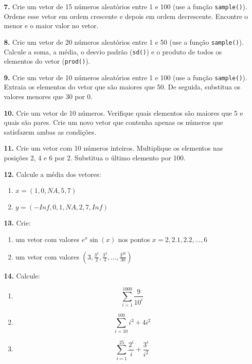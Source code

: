 \documentclass[
]{book}
\providecommand{\tightlist}{%
  \setlength{\itemsep}{0pt}\setlength{\parskip}{0pt}}
\begin{document}
\textbf{7.} Crie um vetor de 15 números aleatórios entre 1 e 100 (use a
função \texttt{sample()}). Ordene esse vetor em ordem crescente e depois em
ordem decrescente. Encontre o menor e o maior valor no vetor.

\textbf{8.} Crie um vetor de 20 números aleatórios entre 1 e 50 (use a função
\texttt{sample()}). Calcule a soma, a média, o desvio padrão (\texttt{sd()}) e o produto de
todos os elementos do vetor (\texttt{prod()}).

\textbf{9.} Crie um vetor de 10 números aleatórios entre 1 e 100 (use a
função \texttt{sample()}). Extraia os elementos do vetor que são maiores que
50. De seguida, substitua os valores menores que 30 por 0.

\textbf{10.} Crie um vetor de 10 números. Verifique quais elementos são
maiores que 5 e quais são pares. Crie um novo vetor que contenha apenas
os números que satisfazem ambas as condições.

\textbf{11.} Crie um vetor com 10 números inteiros. Multiplique os elementos
nas posições 2, 4 e 6 por 2. Substitua o último elemento por 100.

\textbf{12.} Calcule a média dos vetores:

\begin{enumerate}
\def\labelenumi{(\alph{enumi})}
\item
  \(x = (1,0,NA, 5,7)\)
\item
  \(y = (-Inf,0,1,NA,2,7,Inf)\)
\end{enumerate}

\textbf{13.} Crie:

\begin{enumerate}
\def\labelenumi{(\alph{enumi})}
\item
  um vetor com valores \(e^{x} \sin(x)\) nos pontos
  \(x=2,2.1,2.2,\ldots,6\)
\item
  um vetor com valores
  \(\left(3,\frac{3^2}{2},\frac{3^3}{3},\ldots,\frac{3^{30}}{30}\right)\)
\end{enumerate}

\textbf{14.} Calcule:

\begin{enumerate}
\def\labelenumi{(\alph{enumi})}
\tightlist
\item
  \[\sum_{i=1}^{1000}\frac{9}{10^{i}}\]
\item
  \[\sum_{i=10}^{100}i^{3}+4i^{2}\]
\item
  \[\sum_{i=1}^{25}\frac{2^{i}}{i} + \frac{3^{i}}{i^2}\]
\end{enumerate}
\end{document}
